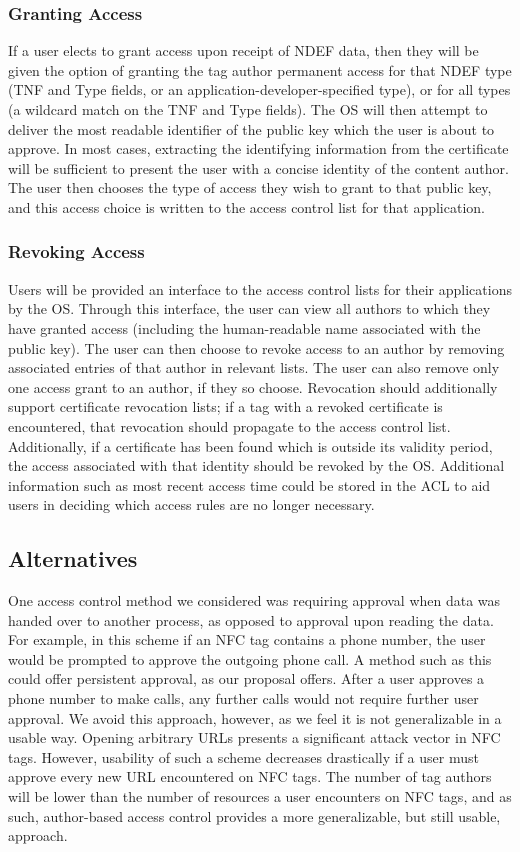 \documentclass[12pt]{article}
\begin{document}
\subsubsection{Granting Access}
If a user elects to grant access upon receipt of NDEF data, then they will be given the option of granting the tag author permanent access for that NDEF type (TNF and Type fields, or an application-developer-specified type), or for all types (a wildcard match on the TNF and Type fields).
The OS will then attempt to deliver the most readable identifier of the public key which the user is about to approve.
In most cases, extracting the identifying information from the certificate will be sufficient to present the user with a concise identity of the content author.
The user then chooses the type of access they wish to grant to that public key, and this access choice is written to the access control list for that application.

\subsubsection{Revoking Access}
Users will be provided an interface to the access control lists for their applications by the OS.
Through this interface, the user can view all authors to which they have granted access (including the human-readable name associated with the public key).
The user can then choose to revoke access to an author by removing associated entries of that author in relevant lists.
The user can also remove only one access grant to an author, if they so choose.
Revocation should additionally support certificate revocation lists; if a tag with a revoked certificate is encountered, that revocation should propagate to the access control list.
Additionally, if a certificate has been found which is outside its validity period, the access associated with that identity should be revoked by the OS.
Additional information such as most recent access time could be stored in the ACL to aid users in deciding which access rules are no longer necessary.


\subsection{Alternatives}
One access control method we considered was requiring approval when data was handed over to another process, as opposed to approval upon reading the data.
For example, in this scheme if an NFC tag contains a phone number, the user would be prompted to approve the outgoing phone call.
A method such as this could offer persistent approval, as our proposal offers.
After a user approves a phone number to make calls, any further calls would not require further user approval.
We avoid this approach, however, as we feel it is not generalizable in a usable way.
Opening arbitrary URLs presents a significant attack vector in NFC tags.
However, usability of such a scheme decreases drastically if a user must approve every new URL encountered on NFC tags.
The number of tag authors will be lower than the number of resources a user encounters on NFC tags, and as such, author-based access control provides a more generalizable, but still usable, approach.
\end{document}
